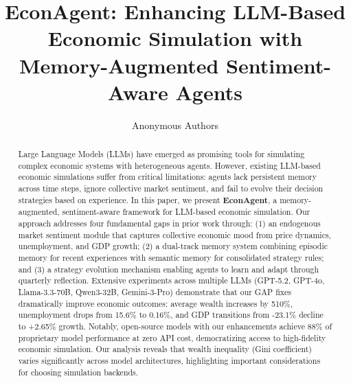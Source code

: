 \documentclass[runningheads]{llncs}
\begin{document}
\begin{center}
\end{center}

\title{EconAgent: Enhancing LLM-Based Economic Simulation with Memory-Augmented Sentiment-Aware Agents}

\author{Anonymous Authors}

\maketitle

\begin{abstract}
Large Language Models (LLMs) have emerged as promising tools for simulating complex economic systems with heterogeneous agents. However, existing LLM-based economic simulations suffer from critical limitations: agents lack persistent memory across time steps, ignore collective market sentiment, and fail to evolve their decision strategies based on experience. In this paper, we present \textbf{EconAgent}, a memory-augmented, sentiment-aware framework for LLM-based economic simulation. Our approach addresses four fundamental gaps in prior work through: (1) an endogenous market sentiment module that captures collective economic mood from price dynamics, unemployment, and GDP growth; (2) a dual-track memory system combining episodic memory for recent experiences with semantic memory for consolidated strategy rules; and (3) a strategy evolution mechanism enabling agents to learn and adapt through quarterly reflection. Extensive experiments across multiple LLMs (GPT-5.2, GPT-4o, Llama-3.3-70B, Qwen3-32B, Gemini-3-Pro) demonstrate that our GAP fixes dramatically improve economic outcomes: average wealth increases by 510\%, unemployment drops from 15.6\% to 0.16\%, and GDP transitions from -23.1\% decline to +2.65\% growth. Notably, open-source models with our enhancements achieve 88\% of proprietary model performance at zero API cost, democratizing access to high-fidelity economic simulation. Our analysis reveals that wealth inequality (Gini coefficient) varies significantly across model architectures, highlighting important considerations for choosing simulation backends.

\end{abstract}
\end{document}
